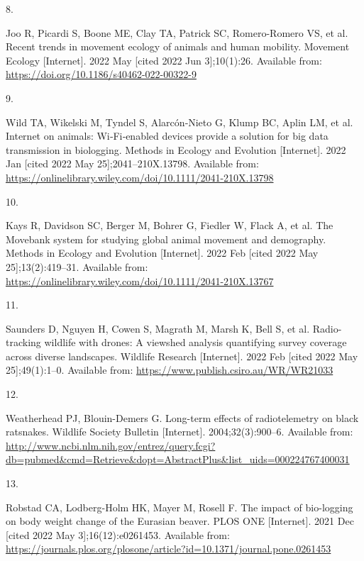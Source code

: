\documentclass[10pt,a4paper]{article}
\newlength{\cslhangindent}
\newlength{\csllabelwidth}
\newlength{\cslentryspacingunit} %
\newenvironment{CSLReferences}[2] %
 {%
  \setlength{\parindent}{0pt}
  \ifodd #1
  \let\oldpar\par
  \def\par{\hangindent=\cslhangindent\oldpar}
  \fi
  \setlength{\parskip}{#2\cslentryspacingunit}
 }%
 {}
\newcommand{\CSLLeftMargin}[1]{\parbox[t]{\csllabelwidth}{#1}}
\newcommand{\CSLRightInline}[1]{\parbox[t]{\linewidth - \csllabelwidth}{#1}\break}
\begin{document}
\begin{CSLReferences}{0}{0}
\leavevmode\hypertarget{ref-joo_recent_2022}{}%
\CSLLeftMargin{8. }
\CSLRightInline{Joo R, Picardi S, Boone ME, Clay TA, Patrick SC, Romero-Romero VS, et al. Recent trends in movement ecology of animals and human mobility. Movement Ecology {[}Internet{]}. 2022 May {[}cited 2022 Jun 3{]};10(1):26. Available from: \url{https://doi.org/10.1186/s40462-022-00322-9}}

\leavevmode\hypertarget{ref-wild_internet_2022}{}%
\CSLLeftMargin{9. }
\CSLRightInline{Wild TA, Wikelski M, Tyndel S, Alarcón‐Nieto G, Klump BC, Aplin LM, et al. Internet on animals: {Wi}‐{Fi}‐enabled devices provide a solution for big data transmission in biologging. Methods in Ecology and Evolution {[}Internet{]}. 2022 Jan {[}cited 2022 May 25{]};2041--210X.13798. Available from: \url{https://onlinelibrary.wiley.com/doi/10.1111/2041-210X.13798}}

\leavevmode\hypertarget{ref-kays_movebank_2022}{}%
\CSLLeftMargin{10. }
\CSLRightInline{Kays R, Davidson SC, Berger M, Bohrer G, Fiedler W, Flack A, et al. The {Movebank} system for studying global animal movement and demography. Methods in Ecology and Evolution {[}Internet{]}. 2022 Feb {[}cited 2022 May 25{]};13(2):419--31. Available from: \url{https://onlinelibrary.wiley.com/doi/10.1111/2041-210X.13767}}

\leavevmode\hypertarget{ref-saunders_radio-tracking_2022}{}%
\CSLLeftMargin{11. }
\CSLRightInline{Saunders D, Nguyen H, Cowen S, Magrath M, Marsh K, Bell S, et al. Radio-tracking wildlife with drones: A viewshed analysis quantifying survey coverage across diverse landscapes. Wildlife Research {[}Internet{]}. 2022 Feb {[}cited 2022 May 25{]};49(1):1--0. Available from: \url{https://www.publish.csiro.au/WR/WR21033}}

\leavevmode\hypertarget{ref-Weatherhead2004}{}%
\CSLLeftMargin{12. }
\CSLRightInline{Weatherhead PJ, Blouin-Demers G. Long-term effects of radiotelemetry on black ratsnakes. Wildlife Society Bulletin {[}Internet{]}. 2004;32(3):900--6. Available from: \url{http://www.ncbi.nlm.nih.gov/entrez/query.fcgi?db=pubmed\&cmd=Retrieve\&dopt=AbstractPlus\&list_uids=000224767400031}}

\leavevmode\hypertarget{ref-robstad_impact_2021}{}%
\CSLLeftMargin{13. }
\CSLRightInline{Robstad CA, Lodberg-Holm HK, Mayer M, Rosell F. The impact of bio-logging on body weight change of the {Eurasian} beaver. PLOS ONE {[}Internet{]}. 2021 Dec {[}cited 2022 May 3{]};16(12):e0261453. Available from: \url{https://journals.plos.org/plosone/article?id=10.1371/journal.pone.0261453}}


\end{CSLReferences}
\end{document}
